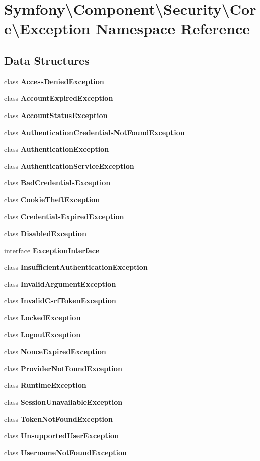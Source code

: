 \section{Symfony\textbackslash{}Component\textbackslash{}Security\textbackslash{}Core\textbackslash{}Exception Namespace Reference}
\label{namespace_symfony_1_1_component_1_1_security_1_1_core_1_1_exception}
\subsection*{Data Structures}
\begin{DoxyCompactItemize}
\item 
class {\bf Access\+Denied\+Exception}
\item 
class {\bf Account\+Expired\+Exception}
\item 
class {\bf Account\+Status\+Exception}
\item 
class {\bf Authentication\+Credentials\+Not\+Found\+Exception}
\item 
class {\bf Authentication\+Exception}
\item 
class {\bf Authentication\+Service\+Exception}
\item 
class {\bf Bad\+Credentials\+Exception}
\item 
class {\bf Cookie\+Theft\+Exception}
\item 
class {\bf Credentials\+Expired\+Exception}
\item 
class {\bf Disabled\+Exception}
\item 
interface {\bf Exception\+Interface}
\item 
class {\bf Insufficient\+Authentication\+Exception}
\item 
class {\bf Invalid\+Argument\+Exception}
\item 
class {\bf Invalid\+Csrf\+Token\+Exception}
\item 
class {\bf Locked\+Exception}
\item 
class {\bf Logout\+Exception}
\item 
class {\bf Nonce\+Expired\+Exception}
\item 
class {\bf Provider\+Not\+Found\+Exception}
\item 
class {\bf Runtime\+Exception}
\item 
class {\bf Session\+Unavailable\+Exception}
\item 
class {\bf Token\+Not\+Found\+Exception}
\item 
class {\bf Unsupported\+User\+Exception}
\item 
class {\bf Username\+Not\+Found\+Exception}
\end{DoxyCompactItemize}
